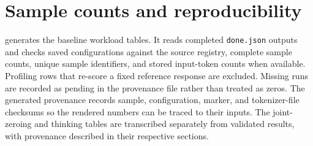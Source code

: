 \appendix
\section{Sample counts and reproducibility}
\begin{table}[ht]
\centering
\caption{Number of questions in each completed baseline workload experiment.}
\label{tab:sample-counts}

\end{table}
 generates the baseline workload tables.
It reads completed \texttt{done.json} outputs and checks saved configurations against
the source registry, complete sample counts, unique sample identifiers, and
stored input-token counts when available. Profiling rows that re-score a fixed
reference response are excluded. Missing runs are recorded as pending in the
provenance file rather than treated as zeros. The generated provenance records
sample, configuration, marker, and tokenizer-file checksums so the rendered
numbers can be traced to their inputs.
The joint-zeroing and thinking tables are transcribed separately from validated
results, with provenance described in their respective sections.
